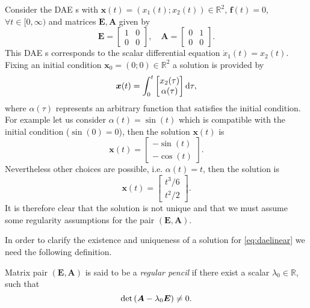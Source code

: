 		\begin{example}
			Consider the DAE s with $\bm{x}(t)=(x_{1}(t);x_{2}(t))\in\mathbb{R}^{2}$, $\bm{f}(t)=0$,$\forall t\in[0,\infty)$ and matrices $\bm{E},\bm{A}$ given by 
			\begin{equation}
				 \bm{E} = 
				 \begin{bmatrix}
				 	1 & 0 \\
				 	0 & 0
				 \end{bmatrix}, \quad
				 \bm{A} = 
				 \begin{bmatrix}
				 	0 & 1 \\
				 	0 & 0
				 \end{bmatrix}.
			\end{equation}
			This DAE s corresponds to the scalar differential equation $\dot{x}_{1}(t) = x_{2}(t)$. Fixing an initial condition $\bm{x}_{0}=(0;0)\in\mathbb{R}^{2}$ a solution is provided by
			\begin{equation}
				\bm{x}(t) = \int_{0}^{t}
				\begin{bmatrix}
					x_{2}(\tau) \\
					\alpha(\tau)
				\end{bmatrix}
				\mathop{}\!\mathrm{d}\tau,
			\end{equation}
			where $\alpha(\tau)$ represents an arbitrary function that satisfies the initial condition.  For example let us consider $\alpha(t) = \sin(t)$ which is compatible with the initial condition ($\sin(0)=0$), then the solution $\bm{x}(t)$ is
			\begin{equation}
				\bm{x}(t) = 
				\begin{bmatrix}
					-\sin(t) \\
					-\cos(t)
				\end{bmatrix}.
			\end{equation}	
			Nevertheless other choices are possible, i.e. $\alpha(t) = t$, then the solution is
			\begin{equation}
				\bm{x}(t) = 
				\begin{bmatrix}
					t^{3}/6\\
					t^{2}/2
				\end{bmatrix}.
			\end{equation}	
			It is therefore clear that the solution is not unique and that we must assume some regularity assumptions for the pair $(\bm{E},\bm{A})$.
		\end{example}
		In order to clarify the existence and uniqueness of a solution for \cref{eq:daelinear} we need the following definition.
		\begin{definition}
			Matrix pair $(\bm{E},\bm{A})$ is said to be a \emph{regular pencil} if there exist a scalar $\lambda_{0}\in\mathbb{R}$, such that
			\begin{equation}
				\mathrm{det}\left(\bm{A}-\lambda_{0}\bm{E}\right) \neq 0.
			\end{equation}
		\end{definition}
